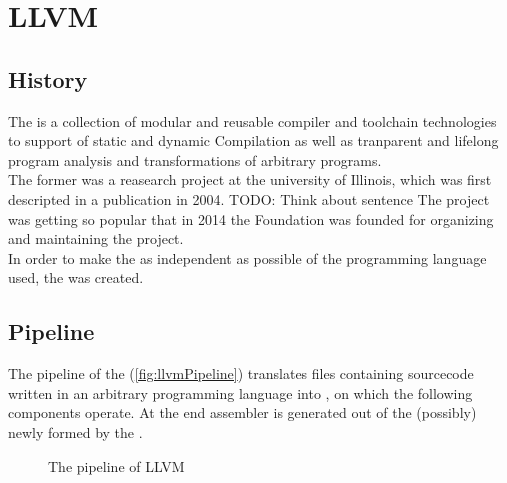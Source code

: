 \chapter{LLVM}
\section{History}
The \llvm is a collection of modular and reusable compiler and toolchain technologies to support of static and dynamic Compilation as well as tranparent and lifelong program analysis and transformations of arbitrary programs. \cite{LLVMWebsite, LLVMResearchBeginning}\\
The \llvm former was a reasearch project at the university of Illinois, which was first descripted in a publication in 2004. TODO: Think about sentence
The project was getting so popular that in 2014 the \llvm Foundation was founded for organizing and maintaining the project. \cite{LLVMFoundation}\\
In order to make the \llvm as independent as possible of the programming language used, the \llvmir was created.

\section{Pipeline \cite{IntroLLVM}}
The pipeline of the \llvm (\autoref{fig:llvmPipeline}) translates files containing sourcecode written in an arbitrary programming language into \llvmir, on which the following components operate.
At the end assembler is generated out of the (possibly) newly formed \llvmir by the \generator.
\begin{figure}[!ht]
    \caption{The pipeline of LLVM}
    \label{fig:llvmPipeline}
    \centering
\end{figure}\\
